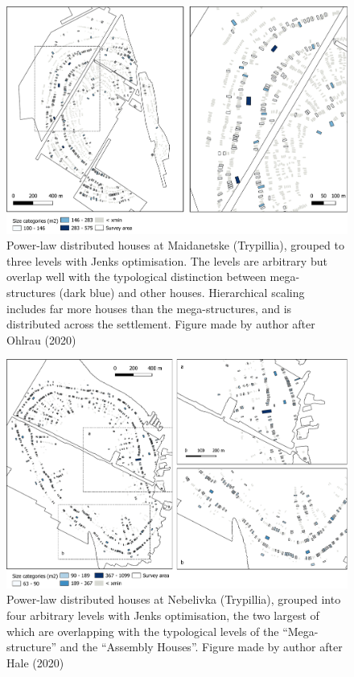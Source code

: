 \documentclass[
  12pt,
  a4paper, twoside]{book}
\begin{document}
\begin{figure}

{\centering \includegraphics[width=0.9\linewidth]{Results/fig06_maidanetske_pl} 

}

\caption[Settlement plan of Maidanetske with power-law houses (details)]{Power-law distributed houses at Maidanetske (Trypillia), grouped to three levels with Jenks optimisation. The levels are arbitrary but overlap well with the typological distinction between mega-structures (dark blue) and other houses. Hierarchical scaling includes far more houses than the mega-structures, and is distributed across the settlement. Figure made by author after Ohlrau (2020)}\label{fig:06-maidanetske-map}
\end{figure}



\begin{figure}

{\centering \includegraphics[width=0.9\linewidth]{Results/fig06_nebelivka_pl} 

}

\caption[Settlement plan of Nebelivka with power-law houses (details)]{Power-law distributed houses at Nebelivka (Trypillia), grouped into four arbitrary levels with Jenks optimisation, the two largest of which are overlapping with the typological levels of the ``Mega-structure'' and the ``Assembly Houses''. Figure made by author after Hale (2020)}\label{fig:06-nebelivka-map}
\end{figure}
\end{document}
